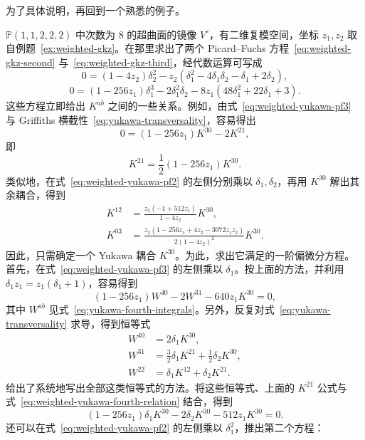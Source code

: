 为了具体说明，再回到一个熟悉的例子。
\begin{example}\label{ex:weighted-yukawa}
$\mathbb P(1,1,2,2,2)$ 中次数为 $8$ 的超曲面的镜像 $V^\circ$，有二维复模空间，坐标 $z_1,z_2$ 取自例题~\ref{ex:weighted-gkz}。在那里求出了两个 Picard--Fuchs 方程~\eqref{eq:weighted-gkz-second} 与~\eqref{eq:weighted-gkz-third}，经代数运算可写成
\begin{equation}\label{eq:weighted-yukawa-pf2}
0=(1-4z_2)\delta_2^2-z_2(\delta_1^2-4\delta_1\delta_2-\delta_1+2\delta_2),
\end{equation}
\begin{equation}\label{eq:weighted-yukawa-pf3}
0=(1-256z_1)\delta_1^3-2\delta_1^2\delta_2
-8z_1(48\delta_1^2+22\delta_1+3).
\end{equation}
这些方程立即给出 $K^{ab}$ 之间的一些关系。例如，由式~\eqref{eq:weighted-yukawa-pf3} 与 Griffiths 横截性~\eqref{eq:yukawa-transversality}，容易得出
\[
0=(1-256z_1)K^{30}-2K^{21},
\]
即
\[
K^{21}=\frac12(1-256z_1)K^{30}.
\]
类似地，在式~\eqref{eq:weighted-yukawa-pf2} 的左侧分别乘以 $\delta_1,\delta_2$，再用 $K^{30}$ 解出其余耦合，得到
\[
\begin{aligned}
K^{12}&=\frac{z_2(-1+512z_1)}{1-4z_2}K^{30},\\
K^{03}&=\frac{z_2(1-256z_1+4z_2-3072z_1z_2)}{2(1-4z_2)^2}K^{30}.
\end{aligned}
\]
因此，只需确定一个 Yukawa 耦合 $K^{30}$。为此，求出它满足的一阶偏微分方程。首先，在式~\eqref{eq:weighted-yukawa-pf3} 的左侧乘以 $\delta_1$。按上面的方法，并利用 $\delta_1z_1=z_1(\delta_1+1)$，容易得到
\begin{equation}\label{eq:weighted-yukawa-fourth-relation}
(1-256z_1)W^{40}-2W^{31}-640z_1K^{30}=0,
\end{equation}
其中 $W^{ab}$ 见式~\eqref{eq:yukawa-fourth-integrals}。另外，反复对式~\eqref{eq:yukawa-transversality} 求导，得到恒等式
\[
\begin{aligned}
W^{40}&=2\delta_1K^{30},\\
W^{31}&=\frac32\delta_1K^{21}+\frac12\delta_2K^{30},\\
W^{22}&=\delta_1K^{12}+\delta_2K^{21}.
\end{aligned}
\]
 给出了系统地写出全部这类恒等式的方法。将这些恒等式、上面的 $K^{21}$ 公式与式~\eqref{eq:weighted-yukawa-fourth-relation} 结合，得到
\[
(1-256z_1)\delta_1K^{30}-2\delta_2K^{30}-512z_1K^{30}=0.
\]
还可以在式~\eqref{eq:weighted-yukawa-pf2} 的左侧乘以 $\delta_1^2$，推出第二个方程：

\end{example}
